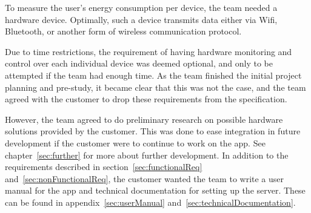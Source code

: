 \noindent To measure the user's energy consumption per device, the team needed a hardware device. Optimally, such a device transmits  data either via Wifi, Bluetooth, or another form of wireless communication protocol.

Due to time restrictions, the requirement of having hardware monitoring and control over each individual device was deemed optional, and only to be attempted if the team had enough time. As the team finished the initial project planning and pre-study, it became clear that this was not the case, and the team agreed with the customer to drop these requirements from the specification. 

However, the team agreed to do preliminary research on possible hardware solutions provided by the customer. This was done to ease integration in future development if the customer were to continue to work on the app. See chapter~\ref{sec:further} for more about further development. In addition to the requirements described in section~\ref{sec:functionalReq} and~\ref{sec:nonFunctionalReq}, the customer wanted the team to write a user manual for the app and technical documentation for setting up the server. These can be found in appendix~\ref{sec:userManual} and~\ref{sec:technicalDocumentation}.
\newpage
 
